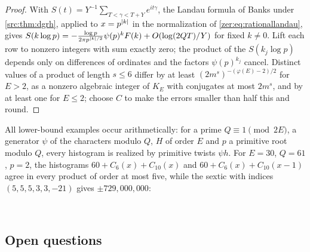 \begin{proof}
With $S(t)=Y^{-1}\sum_{T<\gamma<T+Y}e^{it\gamma}$, the Landau formula of Banks \cite[Theorem~1.2]{Banks2023Comparing} under
\cref{src:thm:dgrh}, applied to $x=p^{\lvert k\rvert}$ in the
normalization of \eqref{zer:eq:rationallandau}, gives $S(k\log p)=-\frac{\log p}{2\pi p^{\lvert k\rvert/2}}\psi(p)^kF(k)+O(\log(2QT)/Y)$ for fixed $k\ne0$. Lift each
row to nonzero integers with sum exactly zero; the product of the $S(k_j\log p)$ depends only on
differences of ordinates and the factors $\psi(p)^{k_j}$ cancel. Distinct values of a product of length
$s\le6$ differ by at least $(2m^s)^{-(\varphi(E)-2)/2}$ for $E>2$, as a nonzero algebraic integer of $K_E$ with
conjugates at most $2m^s$, and by at least one for $E\le2$; choose $C$ to make the errors smaller than
half this and round.
\end{proof}

All lower-bound examples occur arithmetically: for a prime $Q\equiv1\pmod{2E}$, a generator $\psi$ of the
characters modulo $Q$, $H$ of order $E$ and $p$ a primitive root modulo $Q$, every histogram is realized by
primitive twists $\psi h$. For $E=30$, $Q=61$, $p=2$, the histograms $60+C_6(x)+C_{10}(x)$ and
$60+C_6(x)+C_{10}(x-1)$ agree in every product of order at most five, while the sextic with indices
$(5,5,5,3,3,-21)$ gives $\pm729{,}000{,}000$:
\begin{center}
\\
\end{center}

\subsection{Open questions}\label{chz:sec:open}
{\raggedright{}}

